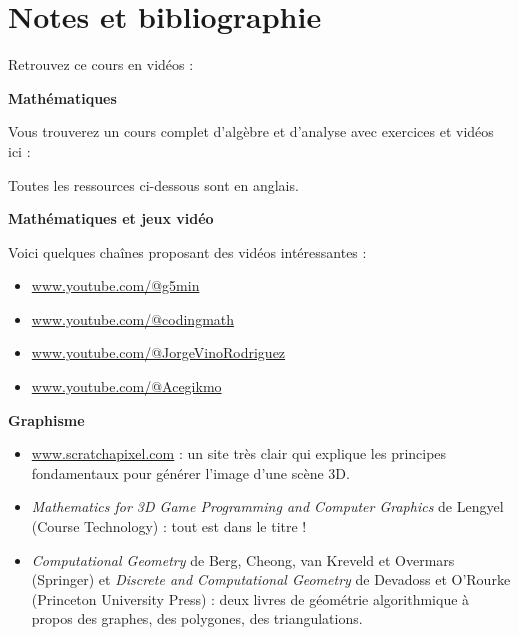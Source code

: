 
\clearemptydoublepage
\pagestyle{empty}\thispagestyle{empty}

\vspace*{\fill}

\section*{Notes et bibliographie}

Retrouvez ce cours en vidéos : 


\textbf{Mathématiques}

Vous trouverez un cours complet d'algèbre et d'analyse avec exercices et vidéos ici : 

\smallskip

Toutes les ressources ci-dessous sont en anglais.


\smallskip


\textbf{Mathématiques et jeux vidéo}

Voici quelques chaînes proposant des vidéos intéressantes :
\begin{itemize}	
  \item \href{https://www.youtube.com/@g5min}{www.youtube.com/@g5min}

  \item \href{https://www.youtube.com/@codingmath}{www.youtube.com/@codingmath}

  \item \href{https://www.youtube.com/@JorgeVinoRodriguez}{www.youtube.com/@JorgeVinoRodriguez}

  \item \href{https://www.youtube.com/@Acegikmo}{www.youtube.com/@Acegikmo}
\end{itemize}

\smallskip

\textbf{Graphisme}

\begin{itemize}
	\item \href{https://www.scratchapixel.com/}{www.scratchapixel.com} : un site très clair qui explique les principes fondamentaux pour générer l'image d'une scène 3D.
	
    \item \emph{Mathematics for	3D Game Programming	and Computer Graphics} de Lengyel (Course Technology) : tout est dans le titre !	
	
	\item \emph{Computational Geometry} de Berg, Cheong, van Kreveld et Overmars (Springer) et 
	\emph{Discrete and Computational Geometry} de Devadoss et O'Rourke (Princeton University Press) :
	deux livres de géométrie algorithmique à propos des graphes, des polygones, des triangulations.

\end{itemize}

